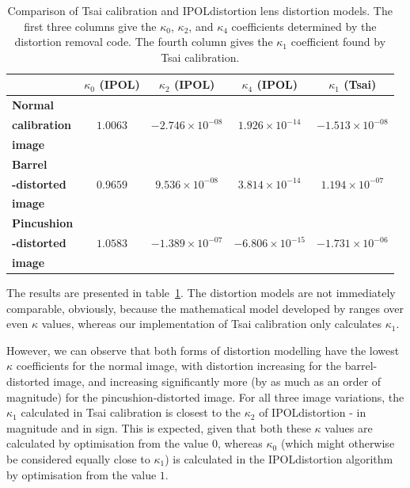 \begin{table}[htb]
  \centering
  \begin{tabular}{| l | c c c | c |}
    \hline
    {\textbf{ }} &
    {\textbf{$\kappa_{0}$ (IPOL)}} &
    {\textbf{$\kappa_{2}$ (IPOL)}} &
    {\textbf{$\kappa_{4}$ (IPOL)}} &
    {\textbf{$\kappa_{1}$ (Tsai)}}\\
    \hline
    {\textbf{Normal}} & { } & { } & { } & { } \\
    {\textbf{calibration}} & {$1.0063$} & {$-2.746 \times 10^{-08}$} & {$1.926 \times 10^{-14}$} & {$-1.513 \times 10^{-08}$} \\
    {\textbf{image}} & { } & { } & { } & { } \\
    \hline
    {\textbf{Barrel}} & { } & { } & { } & { } \\
    {\textbf{-distorted}} & {$0.9659$} & {$9.536 \times 10^{-08}$} & {$3.814 \times 10^{-14}$} & {$1.194 \times 10^{-07}$} \\
    {\textbf{image}} & { } & { } & { } & { } \\
    \hline
    {\textbf{Pincushion}} & { } & { } & { } & { } \\
    {\textbf{-distorted}} & {$1.0583$} & {$-1.389 \times 10^{-07}$} & {$-6.806 \times 10^{-15}$} & {$-1.731 \times 10^{-06}$} \\
    {\textbf{image}} & { } & { } & { } & { } \\
    \hline
  \end{tabular}
  \caption[Comparison of Tsai calibration and IPOLdistortion lens distortion models]{Comparison of Tsai calibration and IPOLdistortion lens distortion models. The first three columns give the $\kappa_{0}$, $\kappa_{2}$, and $\kappa_{4}$ coefficients determined by the distortion removal code. The fourth column gives the $\kappa_{1}$ coefficient found by Tsai calibration.}
  \label{tbl:calib-distort-compare}
\end{table}

The results are presented in table~\ref{tbl:calib-distort-compare}. The distortion models are not immediately comparable, obviously, because the mathematical model developed by \cite{algebraic-distortion} ranges over even $\kappa$ values, whereas our implementation of Tsai calibration only calculates $\kappa_{1}$.

However, we can observe that both forms of distortion modelling have the lowest $\kappa$ coefficients for the normal image, with distortion increasing for the barrel-distorted image, and increasing significantly more (by as much as an order of magnitude) for the pincushion-distorted image. For all three image variations, the $\kappa_{1}$ calculated in Tsai calibration is closest to the $\kappa_{2}$ of IPOLdistortion - in magnitude and in sign. This is expected, given that both these $\kappa$ values are calculated by optimisation from the value $0$, whereas $\kappa_{0}$ (which might otherwise be considered equally close to $\kappa_{1}$) is calculated in the IPOLdistortion algorithm by optimisation from the value $1$.

